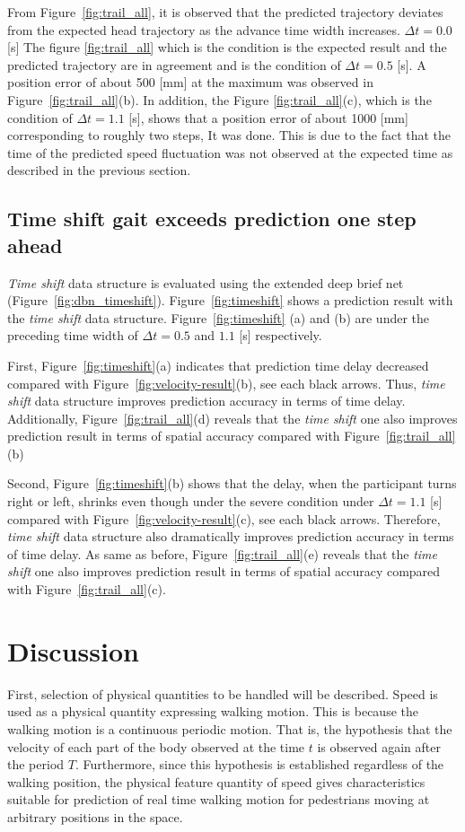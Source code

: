 \documentclass{sigchi}
\begin{document}
From Figure~\ref{fig:trail_all}, it is observed that the predicted trajectory deviates from the expected head trajectory as the advance time width increases. $ \Delta t = 0.0 $ [s] The figure \ref{fig:trail_all} which is the condition is the expected result and the predicted trajectory are in agreement and is the condition of $ \Delta t = 0.5 $ [s]. A position error of about 500 [mm] at the maximum was observed in Figure~\ref{fig:trail_all}(b). In addition, the Figure \ref{fig:trail_all}(c), which is the condition of $ \Delta t = 1.1 $ [s], shows that a position error of about 1000 [mm] corresponding to roughly two steps, It was done. This is due to the fact that the time of the predicted speed fluctuation was not observed at the expected time as described in the previous section.


\subsection{Time shift gait exceeds prediction one step ahead}

\textit{Time shift} data structure is evaluated using the extended deep brief net (Figure~\ref{fig:dbn_timeshift}). Figure~\ref{fig:timeshift} shows a prediction result with the \textit{time shift} data structure. Figure~\ref{fig:timeshift} (a) and (b) are under the preceding time width of $ \Delta t = 0.5$ and $1.1$ [s] respectively. 

First, Figure~\ref{fig:timeshift}(a) indicates that prediction time delay decreased compared with Figure~\ref{fig:velocity-result}(b), see each black arrows. Thus, \textit{time shift} data structure improves prediction accuracy in terms of time delay. Additionally, Figure~\ref{fig:trail_all}(d) reveals that the \textit{time shift} one also improves prediction result in terms of spatial accuracy compared with Figure~\ref{fig:trail_all}(b)

Second, Figure~\ref{fig:timeshift}(b) shows that the delay, when the participant turns right or left, shrinks even though under the severe condition under $\Delta t = 1.1$ [s] compared with Figure~\ref{fig:velocity-result}(c), see each black arrows. Therefore, \textit{time shift} data structure also dramatically improves prediction accuracy in terms of time delay. As same as before, Figure~\ref{fig:trail_all}(e) reveals that the \textit{time shift} one also improves prediction result in terms of spatial accuracy compared with Figure~\ref{fig:trail_all}(c).  


\section{Discussion}
First, selection of physical quantities to be handled will be described. Speed is used as a physical quantity expressing walking motion. This is because the walking motion is a continuous periodic motion. That is, the hypothesis that the velocity of each part of the body observed at the time $ t $ is observed again after the period $ T $. Furthermore, since this hypothesis is established regardless of the walking position, the physical feature quantity of speed gives characteristics suitable for prediction of real time walking motion for pedestrians moving at arbitrary positions in the space.
\end{document}
